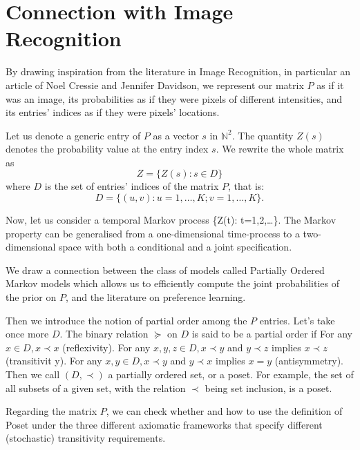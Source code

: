 \documentclass[11pt]{amsart}
\begin{document}
\section{Connection with Image Recognition}

By drawing inspiration from the literature in Image Recognition, in particular an article of Noel Cressie and Jennifer Davidson, we represent our matrix $P$ as if it was an image, its probabilities as if they were pixels of different intensities, and its entries' indices as if they were pixels' locations. 

Let us denote a generic entry of $P$ as a vector $s$ in $\mathbb{N}^2$. The quantity $Z(s)$ denotes the probability value at the entry index $s$. We rewrite the whole matrix as 
\begin{equation}
Z = \{Z(s): s \in D \}
\end{equation}
where $D$ is the set of entries' indices of the matrix $P$, that is:
\begin{equation}
D = \{(u,v): u = 1,\ldots,K;v=1,\ldots,K\}.
\end{equation}

Now, let us consider a temporal Markov process \{Z(t): t=1,2,\ldots\}. The Markov property can be generalised from a one-dimensional time-process to a two-dimensional space with both a conditional and a joint specification. 

We draw a connection between the class of models called Partially Ordered Markov models which allows us to efficiently compute the joint probabilities of the prior on $P$, and the literature on preference learning.

Then we introduce the notion of partial order among the $P$ entries. Let's take once more $D$. The binary relation $\succeq$ on $D$ is said to be a partial order if 
For any $x \in D, x \prec x$ (reflexivity).
For any $x, y, z \in D, x \prec y$ and $y \prec z$ implies $x \prec z$ (transitivit
y).
For any $x, y \in D, x \prec y$ and $y \prec x$ implies $x=y$ (antisymmetry).
Then we call $(D, \prec)$ a partially ordered set, or a poset. For example, the set of all subsets of a given set, with the relation $\prec$ being set inclusion, is a poset.

Regarding the matrix $P$, we can check whether and how to use the definition of Poset under the three different axiomatic frameworks that specify different (stochastic) transitivity requirements.
\end{document}
